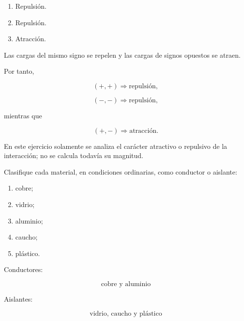 \begin{respuesta}

\begin{enumerate}
    \item Repulsión.
    \item Repulsión.
    \item Atracción.
\end{enumerate}

\end{respuesta}

\begin{explicacion}

Las cargas del mismo signo se repelen y las cargas de signos opuestos se
atraen.

Por tanto,

\[
(+,+)\Longrightarrow\text{repulsión},
\]

\[
(-,-)\Longrightarrow\text{repulsión},
\]

mientras que

\[
(+,-)\Longrightarrow\text{atracción}.
\]

En este ejercicio solamente se analiza el carácter atractivo o repulsivo de
la interacción; no se calcula todavía su magnitud.

\end{explicacion}



\begin{ejercicio}

Clasifique cada material, en condiciones ordinarias, como conductor o
aislante:

\begin{enumerate}
    \item cobre;
    \item vidrio;
    \item aluminio;
    \item caucho;
    \item plástico.
\end{enumerate}

\end{ejercicio}

\begin{respuesta}

Conductores:

\[
\boxed{\text{cobre y aluminio}}
\]

Aislantes:

\[
\boxed{\text{vidrio, caucho y plástico}}
\]

\end{respuesta}

